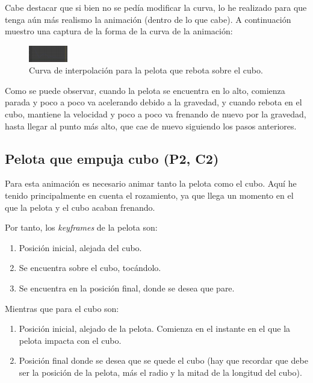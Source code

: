 \documentclass{article}
\begin{document}
Cabe destacar que si bien no se pedía modificar la curva, lo he realizado para que tenga aún más realismo la animación (dentro de lo que cabe). A continuación muestro una captura de la forma de la curva de la animación:


\begin{figure}[H]
    \centering
    \includegraphics[width=0.15\textwidth]{imagenes/curva_p1.png}
    \caption{Curva de interpolación para la pelota que rebota sobre el cubo.}
\end{figure}


Como se puede observar, cuando la pelota se encuentra en lo alto, comienza parada y poco a poco va acelerando debido a la gravedad, y cuando rebota en el cubo, mantiene la velocidad y poco a poco va frenando de nuevo por la gravedad, hasta llegar al punto más alto, que cae de nuevo siguiendo los pasos anteriores.

\subsection{Pelota que empuja cubo (P2, C2)}

Para esta animación es necesario animar tanto la pelota como el cubo. Aquí he tenido principalmente en cuenta el rozamiento, ya que llega un momento en el que la pelota y el cubo acaban frenando.

\bigskip

Por tanto, los \textit{keyframes} de la pelota son:

\begin{enumerate}
    \item Posición inicial, alejada del cubo.
    \item Se encuentra sobre el cubo, tocándolo.
    \item Se encuentra en la posición final, donde se desea que pare.
\end{enumerate}

Mientras que para el cubo son:

\begin{enumerate}
    \item Posición inicial, alejado de la pelota. Comienza en el instante en el que la pelota impacta con el cubo.
    \item Posición final donde se desea que se quede el cubo (hay que recordar que debe ser la posición de la pelota, más el radio y la mitad de la longitud del cubo).
\end{enumerate}
\end{document}
